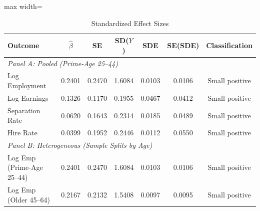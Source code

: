 \begin{table}[t]
\centering
\caption{Standardized Effect Sizes}
\label{tab:sde}
\begin{adjustbox}{max width=\textwidth}
\begin{threeparttable}
\begin{tabular}{lcccccc}
\toprule
Outcome & $\hat{\beta}$ & SE & SD($Y$) & SDE & SE(SDE) & Classification \\
\midrule
\multicolumn{7}{l}{\textit{Panel A: Pooled (Prime-Age 25--44)}} \\
Log Employment & 0.2401 & 0.2470 & 1.6084 & 0.0103 & 0.0106 & Small positive \\
Log Earnings & 0.1326 & 0.1170 & 0.1955 & 0.0467 & 0.0412 & Small positive \\
Separation Rate & 0.0620 & 0.1643 & 0.2314 & 0.0185 & 0.0489 & Small positive \\
Hire Rate & 0.0399 & 0.1952 & 0.2446 & 0.0112 & 0.0550 & Small positive \\
\midrule
\multicolumn{7}{l}{\textit{Panel B: Heterogeneous (Sample Splits by Age)}} \\
Log Emp (Prime-Age 25--44) & 0.2401 & 0.2470 & 1.6084 & 0.0103 & 0.0106 & Small positive \\
Log Emp (Older 45--64) & 0.2167 & 0.2132 & 1.5408 & 0.0097 & 0.0095 & Small positive \\
\bottomrule
\end{tabular}
\begin{tablenotes}[flushleft]
\scriptsize\sloppy

\end{tablenotes}
\end{threeparttable}
\end{adjustbox}
\end{table}
